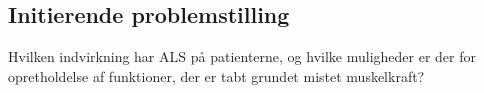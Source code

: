 \subsection{Initierende problemstilling}
Hvilken indvirkning har ALS på patienterne, og hvilke muligheder er der for opretholdelse af funktioner, der er tabt grundet mistet muskelkraft?